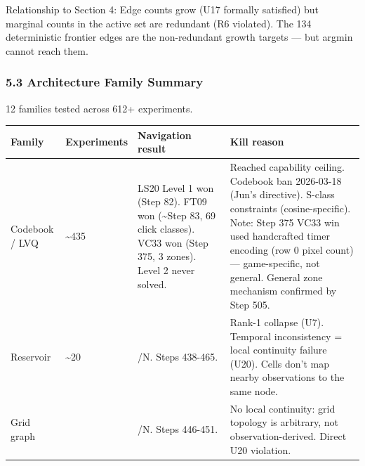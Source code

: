\documentclass[
  11pt,
]{article}
\newcounter{none} %
\begin{document}
Relationship to Section 4: Edge counts grow (U17 formally satisfied) but
marginal counts in the active set are redundant (R6 violated). The 134
deterministic frontier edges are the non-redundant growth targets ---
but argmin cannot reach them.

\subsubsection{5.3 Architecture Family
Summary}\label{architecture-family-summary}

12 families tested across 612+ experiments.

{\def\LTcaptype{none} %
\begin{longtable}[]{@{}
  >{\raggedright\arraybackslash}p{}
  >{\raggedright\arraybackslash}p{}
  >{\raggedright\arraybackslash}p{}
  >{\raggedright\arraybackslash}p{}@{}}
\toprule\noalign{}
\begin{minipage}[b]{\linewidth}\raggedright
Family
\end{minipage} & \begin{minipage}[b]{\linewidth}\raggedright
Experiments
\end{minipage} & \begin{minipage}[b]{\linewidth}\raggedright
Navigation result
\end{minipage} & \begin{minipage}[b]{\linewidth}\raggedright
Kill reason
\end{minipage} \\
\midrule\noalign{}
\endhead
\bottomrule\noalign{}
\endlastfoot
Codebook / LVQ & \textasciitilde435 & LS20 Level 1 won (Step 82). FT09
won (\textasciitilde Step 83, 69 click classes). VC33 won (Step 375, 3
zones). Level 2 never solved. & Reached capability ceiling. Codebook ban
2026-03-18 (Jun's directive). S-class constraints (cosine-specific).
Note: Step 375 VC33 win used handcrafted timer encoding (row 0 pixel
count) --- game-specific, not general. General zone mechanism confirmed
by Step 505. \\
Reservoir & \textasciitilde20 & 0/N. Steps 438-465. & Rank-1 collapse
(U7). Temporal inconsistency = local continuity failure (U20). Cells
don't map nearby observations to the same node. \\
Grid graph & 8 & 0/N. Steps 446-451. & No local continuity: grid
topology is arbitrary, not observation-derived. Direct U20 violation. \\

\end{longtable}}
\end{document}
